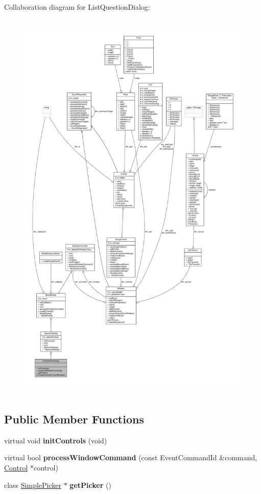 Collaboration diagram for List\+Question\+Dialog\+:
\nopagebreak
\begin{figure}[H]
\begin{center}
\leavevmode
\includegraphics[height=550pt]{db/d04/classListQuestionDialog__coll__graph}
\end{center}
\end{figure}
\subsection*{Public Member Functions}
\begin{DoxyCompactItemize}
\item 
virtual void {\bfseries init\+Controls} (void)\hypertarget{classListQuestionDialog_ae7d665565e4f978e52632b47d396a82e}{}\label{classListQuestionDialog_ae7d665565e4f978e52632b47d396a82e}

\item 
virtual bool {\bfseries process\+Window\+Command} (const Event\+Command\+Id \&command, \hyperlink{classControl}{Control} $\ast$control)\hypertarget{classListQuestionDialog_a13fc129d0473624b23e24fe53e609eeb}{}\label{classListQuestionDialog_a13fc129d0473624b23e24fe53e609eeb}

\item 
class \hyperlink{classSimplePicker}{Simple\+Picker} $\ast$ {\bfseries get\+Picker} ()\hypertarget{classListQuestionDialog_a49e81f277eeeac265fd41502d6c123b8}{}\label{classListQuestionDialog_a49e81f277eeeac265fd41502d6c123b8}

\end{DoxyCompactItemize}
